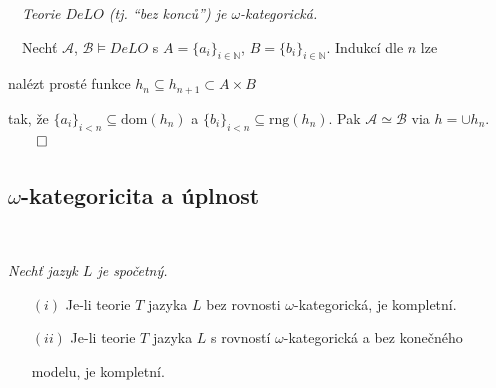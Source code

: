     {\bf {}}\ \ {\it Teorie $DeLO$ \emph{(tj. ``bez konců'')} je $\omega$-kategorická.}
    \medskip
    
    {\it {}}\ \ Nechť $\mathcal{A}$, $\mathcal{B} \models DeLO$ s $A=\{a_i\}_{i\in \mathbb{N}}$, $B=\{b_i\}_{i\in \mathbb{N}}$. Indukcí dle $n$ lze
    \smallskip
    
    nalézt prosté  funkce $h_n\subseteq h_{n+1}\subset A\times B$ 
    \smallskip
    
    tak, že $\{a_i\}_{i< n}\subseteq \mathrm{dom}(h_n)$ a $\{b_i\}_{i< n}\subseteq \mathrm{rng}(h_n)$. Pak $\mathcal{A}\simeq \mathcal{B}$ via $h=\cup h_n$. $\qed$
    \bigskip
    
    \mygreen{\it Obdobně dostaneme, že např. $\mathcal{A}=\langle \mathbb{Q},\le\rangle$, $\mathcal{A} \upharpoonright (0,1]$, $\mathcal{A} \upharpoonright [0,1)$, $\mathcal{A} \upharpoonright [0,1]$}
    \smallskip
    
    \vspace{-2mm}
    
    \vspace{-6mm}

\subsection{$\omega$-kategoricita a úplnost}\todo


{\bf {}}\ \ {\it Nechť jazyk $L$ je spočetný.
\vspace{0.5mm}

\begin{enumerate}
\item[$(i)$] Je-li teorie $T$ jazyka $L$ bez rovnosti $\omega$-kategorická, je kompletní.
\smallskip

\item[$(ii)$] Je-li teorie $T$ jazyka $L$ s rovností $\omega$-kategorická a bez konečného
\smallskip

 modelu, je kompletní.
\end{enumerate}}
\medskip

